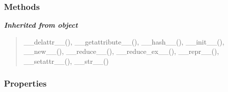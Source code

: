   \subsubsection{Methods}


\large{\textbf{\textit{Inherited from object}}}

\begin{quote}
\_\_delattr\_\_(), \_\_getattribute\_\_(), \_\_hash\_\_(), \_\_init\_\_(), \_\_new\_\_(), \_\_reduce\_\_(), \_\_reduce\_ex\_\_(), \_\_repr\_\_(), \_\_setattr\_\_(), \_\_str\_\_()
\end{quote}


  \subsubsection{Properties}

